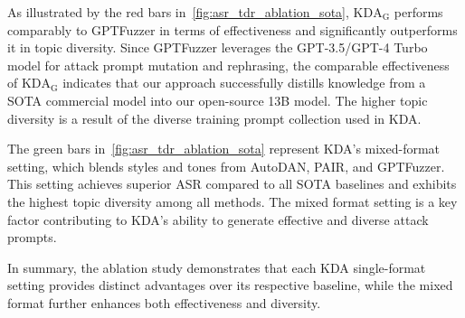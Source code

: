  As illustrated by the red bars in~\autoref{fig:asr_tdr_ablation_sota}, $\text{KDA}_{\text{G}}$ performs comparably to GPTFuzzer in terms of effectiveness and significantly outperforms it in topic diversity. Since GPTFuzzer leverages the GPT-3.5/GPT-4 Turbo model for attack prompt mutation and rephrasing, the comparable effectiveness of $\text{KDA}_{\text{G}}$ indicates that our approach successfully distills knowledge from a SOTA commercial model into our open-source 13B model. The higher topic diversity is a result of the diverse training prompt collection used in KDA.

 The green bars in~\autoref{fig:asr_tdr_ablation_sota} represent KDA's mixed-format setting, which blends styles and tones from AutoDAN, PAIR, and GPTFuzzer. This setting achieves superior ASR compared to all SOTA baselines and exhibits the highest topic diversity among all methods. The mixed format setting is a key factor contributing to KDA's ability to generate effective and diverse attack prompts.

In summary, the ablation study demonstrates that each KDA single-format setting provides distinct advantages over its respective baseline, while the mixed format further enhances both effectiveness and diversity.



